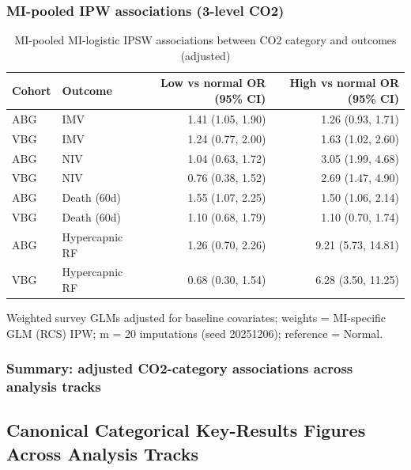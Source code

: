 \documentclass[
  11pt,
  letterpaper,
  DIV=11,
  numbers=noendperiod]{scrartcl}
\begin{document}
\subsubsection{MI-pooled IPW associations (3-level
CO2)}\label{mi-pooled-ipw-associations-3-level-co2}

\begin{table}
\caption*{
{\fontsize{20}{25}\selectfont  MI-pooled MI-logistic IPSW associations between CO2 category and outcomes (adjusted)\fontsize{12}{15}\selectfont }
} 
\fontsize{12.0pt}{14.0pt}\selectfont
\begin{tabular*}{\linewidth}{@{\extracolsep{\fill}}llrr}
\toprule
Cohort & Outcome & Low vs normal OR (95\% CI) & High vs normal OR (95\% CI) \\ 
\midrule\addlinespace[2.5pt]
ABG & IMV & 1.41 (1.05, 1.90) & 1.26 (0.93, 1.71) \\ 
VBG & IMV & 1.24 (0.77, 2.00) & 1.63 (1.02, 2.60) \\ 
ABG & NIV & 1.04 (0.63, 1.72) & 3.05 (1.99, 4.68) \\ 
VBG & NIV & 0.76 (0.38, 1.52) & 2.69 (1.47, 4.90) \\ 
ABG & Death (60d) & 1.55 (1.07, 2.25) & 1.50 (1.06, 2.14) \\ 
VBG & Death (60d) & 1.10 (0.68, 1.79) & 1.10 (0.70, 1.74) \\ 
ABG & Hypercapnic RF & 1.26 (0.70, 2.26) & 9.21 (5.73, 14.81) \\ 
VBG & Hypercapnic RF & 0.68 (0.30, 1.54) & 6.28 (3.50, 11.25) \\ 
\bottomrule
\end{tabular*}
\begin{minipage}{\linewidth}
\vspace{.05em}
Weighted survey GLMs adjusted for baseline covariates; weights = MI-specific GLM (RCS) IPW; m = 20 imputations (seed 20251206); reference = Normal.\\
\end{minipage}
\end{table}

\subsubsection{Summary: adjusted CO2-category associations across
analysis
tracks}\label{summary-adjusted-co2-category-associations-across-analysis-tracks}

\subsection{Canonical Categorical Key-Results Figures Across Analysis
Tracks}\label{canonical-categorical-key-results-figures-across-analysis-tracks}
\end{document}
